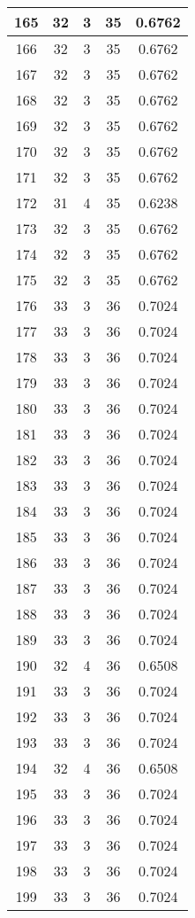 \documentclass[letterpaper, 12pt]{article}
\begin{document}
\begin{longtable}{|c|c|c|c|c|}
\hline
165 & 32 & 3 & 35 & 0.6762 \\
\hline
166 & 32 & 3 & 35 & 0.6762 \\
\hline
167 & 32 & 3 & 35 & 0.6762 \\
\hline
168 & 32 & 3 & 35 & 0.6762 \\
\hline
169 & 32 & 3 & 35 & 0.6762 \\
\hline
170 & 32 & 3 & 35 & 0.6762 \\
\hline
171 & 32 & 3 & 35 & 0.6762 \\
\hline
172 & 31 & 4 & 35 & 0.6238 \\
\hline
173 & 32 & 3 & 35 & 0.6762 \\
\hline
174 & 32 & 3 & 35 & 0.6762 \\
\hline
175 & 32 & 3 & 35 & 0.6762 \\
\hline
176 & 33 & 3 & 36 & 0.7024 \\
\hline
177 & 33 & 3 & 36 & 0.7024 \\
\hline
178 & 33 & 3 & 36 & 0.7024 \\
\hline
179 & 33 & 3 & 36 & 0.7024 \\
\hline
180 & 33 & 3 & 36 & 0.7024 \\
\hline
181 & 33 & 3 & 36 & 0.7024 \\
\hline
182 & 33 & 3 & 36 & 0.7024 \\
\hline
183 & 33 & 3 & 36 & 0.7024 \\
\hline
184 & 33 & 3 & 36 & 0.7024 \\
\hline
185 & 33 & 3 & 36 & 0.7024 \\
\hline
186 & 33 & 3 & 36 & 0.7024 \\
\hline
187 & 33 & 3 & 36 & 0.7024 \\
\hline
188 & 33 & 3 & 36 & 0.7024 \\
\hline
189 & 33 & 3 & 36 & 0.7024 \\
\hline
190 & 32 & 4 & 36 & 0.6508 \\
\hline
191 & 33 & 3 & 36 & 0.7024 \\
\hline
192 & 33 & 3 & 36 & 0.7024 \\
\hline
193 & 33 & 3 & 36 & 0.7024 \\
\hline
194 & 32 & 4 & 36 & 0.6508 \\
\hline
195 & 33 & 3 & 36 & 0.7024 \\
\hline
196 & 33 & 3 & 36 & 0.7024 \\
\hline
197 & 33 & 3 & 36 & 0.7024 \\
\hline
198 & 33 & 3 & 36 & 0.7024 \\
\hline
199 & 33 & 3 & 36 & 0.7024 \\
\hline
\end{longtable}
\end{document}
